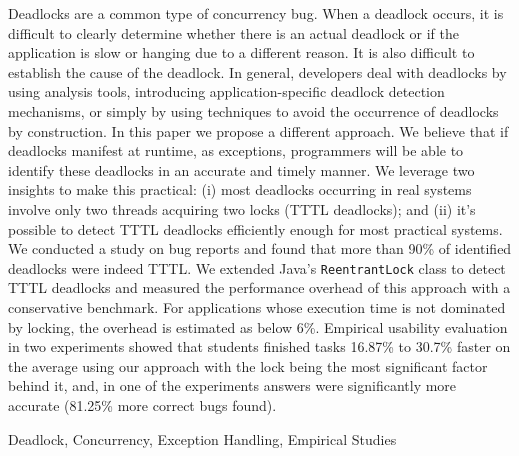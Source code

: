 Deadlocks are a common type of concurrency bug.
When a deadlock occurs, it is difficult to clearly determine whether there is an actual deadlock or if the application is slow or hanging due to a different reason. It is also difficult to establish the cause of the deadlock.
In general, developers deal with deadlocks by using analysis tools, introducing application-specific deadlock detection mechanisms, or simply by using techniques to avoid the occurrence of deadlocks by construction.
In this paper we propose a different approach. We believe that if deadlocks manifest at runtime, as exceptions, programmers will be able to identify these deadlocks in an accurate and timely manner.
We leverage two insights to make this practical:
(i) most deadlocks occurring in real systems involve only two threads acquiring two locks (TTTL deadlocks);
and (ii) it's possible to detect TTTL deadlocks efficiently enough for most practical systems.
We conducted a study on bug reports and found that more than 90\%  of identified deadlocks were indeed TTTL.
We extended Java's {\tt ReentrantLock} class to detect TTTL deadlocks and measured the performance overhead of this approach with a conservative benchmark. For applications whose execution time is not dominated by locking, the overhead is estimated as below 6\%.
Empirical usability evaluation in two experiments showed that students finished tasks 16.87\% to 30.7\% faster on the average using our approach with the lock being the most significant factor behind it, and, in one of the experiments answers were significantly more accurate (81.25\% more correct bugs found).

\begin{keywords}
Deadlock, Concurrency, Exception Handling, Empirical Studies
\end{keywords}
